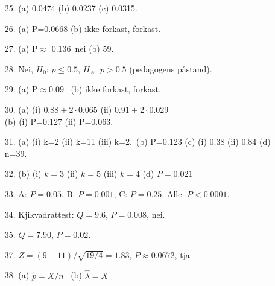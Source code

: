 \begin{itemize}
           [0.0162 , 0.1167], [0.0480 , 0.1839]\\
           {[}0.0002 , 0.0279], [0.0012 , 0.0361],
           [0.0081 , 0.0584], [0.0240 , 0.0920]
\item[25.]  (a) 0.0474   (b) 0.0237   (c) 0.0315.
\item[26.]  (a) P=0.0668   (b) ikke forkast, forkast.
\item[27.]  (a) P$\approx$ 0.136\   nei   (b) 59.
\item[28.]  Nei, $H_0$: $p\leq 0.5$, $H_A$: $p> 0.5$ (pedagogens påstand).
\item[29.]  (a) P$\approx$0.09  \ (b) ikke forkast, forkast.
\item[30.]  (a) (i) $0.88 \pm 2\cdot 0.065$   (ii) $0.91 \pm 2\cdot 0.029$\\
              (b) (i) P=0.127   (ii) P=0.063.
\item[31.]  (a) (i) k=2   (ii) k=11   (iii) k=2.\
            (b) P=0.123   (c) (i) 0.38  (ii) 0.84   (d) n=39.
\item[32.] (b) (i) $k=3$ (ii) $k=5$ (iii) $k=4$ (d) $P=0.021$
\item[33.]  A: $P=0.05$, B: $P=0.001$, C: $P=0.25$, Alle: $P<0.0001$.
\item[34.] Kjikvadrattest: $Q=9.6$, $P=0.008$, nei.
\item[35.]  $Q=7.90$,  $P=0.02$.
\item[37.] $Z=(9-11)/\sqrt{19/4}=1.83$, $P\approx 0.0672$, tja
\item[38.] (a) $\hat{p}=X/n$ \ (b) $\hat{\lambda}=X$
\end{itemize}         
         
